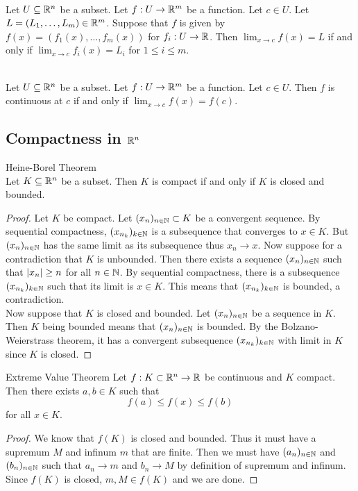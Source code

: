 \documentclass[a4paper]{article}
\begin{document}
\begin{lmm}{}{}\\
Let $U\subseteq\mathbb{R}^n$ be a subset. Let $f:U\to\mathbb{R}^m$ be a function. Let $c\in U$. Let $L=(L_1,\dots,L_m)\in\mathbb{R}^m$. Suppose that $f$ is given by $f(x)=(f_1(x),\dots,f_m(x))$ for $f_i:U\to\mathbb{R}$. Then $\lim_{x\to c}f(x)=L$ if and only if $\lim_{x\to c}f_i(x)=L_i$ for $1\leq i\leq m$. 
\end{lmm}

\begin{lmm}{}{}\\
Let $U\subseteq\mathbb{R}^n$ be a subset. Let $f:U\to\mathbb{R}^m$ be a function. Let $c\in U$. Then $f$ is continuous at $c$ if and only if $\lim_{x\to c}f(x)=f(c)$. 
\end{lmm}

\subsection{Compactness in $\mathbb{R}^n$}
\begin{thm}{Heine-Borel Theorem}{}\\
Let $K\subseteq\mathbb{R}^n$ be a subset. Then $K$ is compact if and only if $K$ is closed and bounded. 
\begin{proof}
Let $K$ be compact. Let $(x_n)_{n\in\mathbb{N}}\subset K$ be a convergent sequence. By sequential compactness, $(x_{n_k})_{k\in\mathbb{N}}$ is a subsequence that converges to $x\in K$. But $(x_n)_{n\in\mathbb{N}}$ has the same limit as its subsequence thus $x_n\to x$. Now suppose for a contradiction that $K$ is unbounded. Then there exists a sequence $(x_n)_{n\in\mathbb{N}}$ such that $\abs{x_n}\geq n$ for all $n\in\mathbb{N}$. By sequential compactness, there is a subsequence $(x_{n_k})_{k\in\mathbb{N}}$ such that its limit is $x\in K$. This means that $(x_{n_k})_{k\in\mathbb{N}}$ is bounded, a contradiction. \\
Now suppose that $K$ is closed and bounded. Let $(x_n)_{n\in\mathbb{N}}$ be a sequence in $K$. Then $K$ being bounded means that $(x_n)_{n\in\mathbb{N}}$ is bounded. By the Bolzano-Weierstrass theorem, it has a convergent subsequence $(x_{n_k})_{k\in\mathbb{N}}$ with limit in $K$ since $K$ is closed. 
\end{proof}
\end{thm}

\begin{thm}{Extreme Value Theorem}{} Let $f:K\subset\mathbb{R}^n\to\mathbb{R}$ be continuous and $K$ compact. Then there exists $a,b\in K$ such that $$f(a)\leq f(x)\leq f(b)$$ for all $x\in K$. 
\begin{proof}
We know that $f(K)$ is closed and bounded. Thus it must have a supremum $M$ and infinum $m$ that are finite. Then we must have $(a_n)_{n\in\mathbb{N}}$ and $(b_n)_{n\in\mathbb{N}}$ such that $a_n\to m$ and $b_n\to M$ by definition of supremum and infinum. Since $f(K)$ is closed, $m,M\in f(K)$ and we are done. 
\end{proof}
\end{thm}
\end{document}
